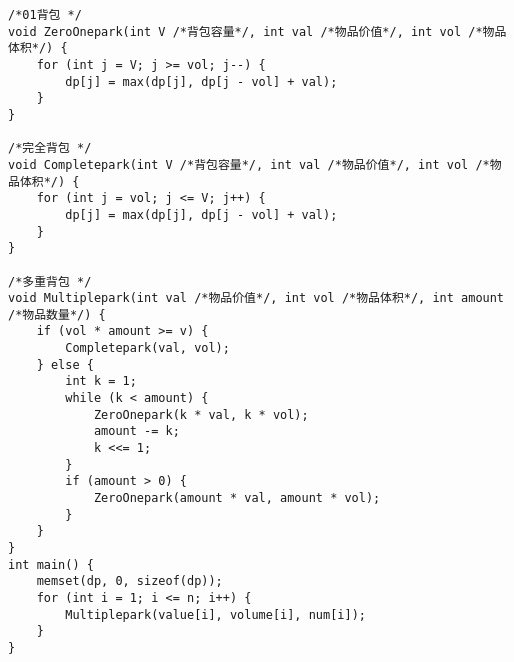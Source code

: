 \begin{lstlisting}
/*01背包 */
void ZeroOnepark(int V /*背包容量*/, int val /*物品价值*/, int vol /*物品体积*/) {
	for (int j = V; j >= vol; j--) {
		dp[j] = max(dp[j], dp[j - vol] + val);
	}
}

/*完全背包 */
void Completepark(int V /*背包容量*/, int val /*物品价值*/, int vol /*物品体积*/) {
	for (int j = vol; j <= V; j++) {
		dp[j] = max(dp[j], dp[j - vol] + val);
	}
}

/*多重背包 */
void Multiplepark(int val /*物品价值*/, int vol /*物品体积*/, int amount /*物品数量*/) {
	if (vol * amount >= v) {
		Completepark(val, vol);
	} else {
		int k = 1;
		while (k < amount) {
			ZeroOnepark(k * val, k * vol);
			amount -= k;
			k <<= 1;
		}
		if (amount > 0) {
			ZeroOnepark(amount * val, amount * vol);
		}
	}
}
int main() {
	memset(dp, 0, sizeof(dp));
	for (int i = 1; i <= n; i++) {
		Multiplepark(value[i], volume[i], num[i]);
	}
}

\end{lstlisting}